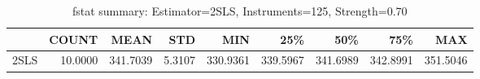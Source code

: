\begin{table}[ht]
\centering
\caption{fstat summary: Estimator=2SLS, Instruments=125, Strength=0.70}
\begin{tabular}{lrrrrrrrr}
\toprule
 & COUNT & MEAN & STD & MIN & 25\% & 50\% & 75\% & MAX \\
\midrule
2SLS & 10.0000 & 341.7039 & 5.3107 & 330.9361 & 339.5967 & 341.6989 & 342.8991 & 351.5046 \\
\bottomrule
\end{tabular}
\end{table}
